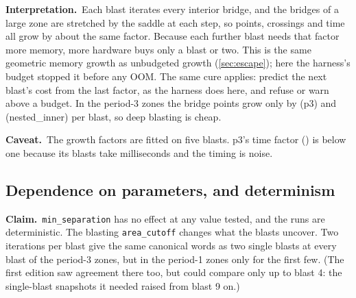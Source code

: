 \documentclass[11pt,a4paper]{article}
\newcommand{\claim}{\par\smallskip\noindent\textbf{Claim.}~}
\newcommand{\reading}{\par\smallskip\noindent\textbf{Interpretation.}~}
\newcommand{\caveat}{\par\smallskip\noindent\textbf{Caveat.}~}
\newcommand{\code}[1]{\texttt{#1}}
\begin{document}
\reading Each blast iterates every interior bridge, and the bridges of a
large zone are stretched by the saddle at each step, so points, crossings
and time all grow by about the same factor. Because each further blast
needs that factor more memory, more hardware buys only a blast or two. This
is the same geometric memory growth as unbudgeted growth (\cref{sec:escape});
here the harness's budget stopped it before any OOM. The same cure applies: predict the next blast's cost from the last factor, as
the harness does here, and refuse or warn above a budget. In the period-3
zones the bridge points grow only by \NumDeepPointGrowthPThree{} (p3) and
\NumDeepPointGrowthNestedInner{} (nested\_inner) per blast, so deep
blasting is cheap.

\caveat The growth factors are fitted on five blasts. p3's time factor
(\NumDeepTimeGrowthPThree) is below one because its blasts take milliseconds
and the timing is noise.

\subsection{Dependence on parameters, and determinism}
\label{sec:blastdepth-params}

\claim \code{min\_separation} has no effect at any value tested, and the
runs are deterministic. The blasting \code{area\_cutoff} changes what the
blasts uncover. Two iterations per blast give the same canonical words as
two single blasts at every blast of the period-3 zones, but in the period-1
zones only for the first few. (The first edition saw agreement there too,
but could compare only up to blast 4: the single-blast snapshots it needed
raised from blast 9 on.)
\end{document}
